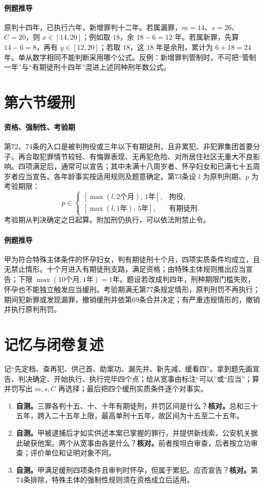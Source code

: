 \paragraph{例题推导}
原判十四年，已执行六年，新增罪判十二年。若属漏罪，\(m=14\)、\(s=26\)、\(C=20\)，则 \(x\in[14,20]\)；例如取 \(18\)，余 \(18-6=12\) 年。若属新罪，先算 \(14-6=8\)，再有 \(y\in[12,20]\)；若取 \(18\)，这 \(18\) 年是余刑，累计为 \(6+18=24\) 年。单从数字相同不能判断采用哪个公式。反例：新增罪判管制时，不可把“管制一年”与“有期徒刑十四年”混进上述同种刑年数公式。

\section{第六节\quad 缓刑}
\paragraph{资格、强制性、考验期}
第72、74条的入口是被判拘役或三年以下有期徒刑，且非累犯、非犯罪集团首要分子。再合取犯罪情节较轻、有悔罪表现、无再犯危险、对所居住社区无重大不良影响。四项满足后，通常可以宣告；其中未满十八周岁者、怀孕妇女和已满七十五周岁者应当宣告。各年龄事实按适用规则及题意确定。第73条设 \(l\) 为原判刑期、\(p\) 为考验期限：
\[
 p\in
 \begin{cases}
 [\max(l,2\text{个月}),\,1\text{年}],&\text{拘役},\\
 [\max(l,1\text{年}),\,5\text{年}],&\text{有期徒刑}.
 \end{cases}
\]
考验期从判决确定之日起算。附加刑仍执行，可以依法附禁止令。

\paragraph{例题推导}
甲为符合特殊主体条件的怀孕妇女，判有期徒刑十个月，四项实质条件均成立，且无禁止情形。十个月进入有期徒刑支路，满足资格；由特殊主体规则推出应当宣告；下限 \(\max(10\text{个月},1\text{年})=1\text{年}\)。题设若改成判四年，刑种期限门槛失败，怀孕也不能独立触发应当缓刑。考验期满无第77条规定情形，原判刑罚不再执行；期间犯新罪或发现漏罪，撤销缓刑并依第69条合并决定；有严重违规情形的，撤销并执行原判刑罚。

\section*{记忆与闭卷复述}
记“先定档、查再犯、供己首、助案功、漏先并、新先减、缓看四”。拿到题先画宣告、判决确定、开始执行、执行完毕四个点；给从宽事由标注“可以”或“应当”；算并罚写出 \(m,s,C\) 再选择；最后把四个缓刑实质条件逐个对事实。
\begin{enumerate}
 \item \textbf{自测。}三罪各判十五、十、十年有期徒刑，并罚区间是什么？\quad\textbf{核对。}总和三十五年，跨入二十五年上限，最高单刑十五年，故区间为十五至二十五年。
 \item \textbf{自测。}甲被逮捕后才如实供述本案已掌握的罪行，并提供新线索，公安机关据此破获他案。两个从宽事由各是什么？\quad\textbf{核对。}前者按坦白审查，后者按立功审查；评价单位和证明对象不同。
 \item \textbf{自测。}甲满足缓刑四项条件且审判时怀孕，但属于累犯。应否宣告？\quad\textbf{核对。}第74条排除，特殊主体的强制性规则须在资格成立后适用。
\end{enumerate}
